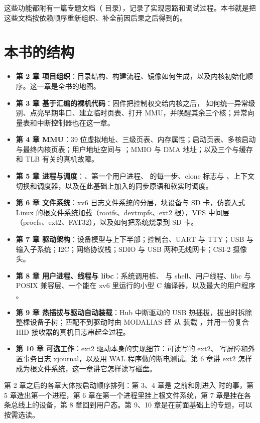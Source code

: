 这些功能都附有一篇专题文档（ 目录），记录了实现思路和调试过程。本书就是把这些文档按依赖顺序重新组织、补全前因后果之后得到的。

\section{本书的结构}

\begin{itemize}
  \item \textbf{第 2 章 项目组织}：目录结构、构建流程、镜像如何生成，以及内核初始化顺序。这一章是全书的地图。
  \item \textbf{第 3 章 基于汇编的裸机代码}：固件把控制权交给内核之后， 如何统一异常级别、点亮早期串口、建立临时页表、打开 MMU，并唤醒其余三个核；异常向量表和中断控制器也在这一章。
  \item \textbf{第 4 章 MMU}：39 位虚拟地址、三级页表、内存属性；启动页表、多核启动与最终内核页表；用户地址空间与 ；MMIO 与 DMA 地址；以及三个与缓存和 TLB 有关的真机故障。
  \item \textbf{第 5 章 进程与调度}：、第一个用户进程、 的每一步、clone 标志与 、上下文切换和调度器，以及在此基础上加入的同步原语和软实时调度。
  \item \textbf{第 6 章 文件系统}：xv6 日志文件系统的分层，块设备与 SD 卡，仿嵌入式 Linux 的根文件系统加载（rootfs、devtmpfs、ext2 根），VFS 中间层（procfs、ext2、FAT32），以及如何把系统烧录到 SD 卡。
  \item \textbf{第 7 章 驱动架构}：设备模型与上下半部；控制台、UART 与 TTY；USB 与输入子系统；I2C；网络协议栈；SDIO 与 USB 两种无线网卡；CSI-2 摄像头。
  \item \textbf{第 8 章 用户进程、线程与 libc}：系统调用桩、 与 shell、用户线程、libc 与 POSIX 兼容层、一个能在 xv6 里运行的小型 C 编译器，以及最大的用户程序 。
  \item \textbf{第 9 章 热插拔与驱动自动装载}：Hub 中断驱动的 USB 热插拔，拔出时拆除整棵设备子树；匹配不到驱动时由 MODALIAS 经  从  装载 ，并用一份复合 HID 接收器的真机日志串起全过程。
  \item \textbf{第 10 章 可选工作}：ext2 驱动本身的实现细节：可读写的 ext2、 写屏障和外置事务日志 xjournal，以及用 WAL 程序做的断电测试。第 6 章讲 ext2 怎样成为根文件系统，这一章讲它怎样读写磁盘。
\end{itemize}

第 2 章之后的各章大体按启动顺序排列：第 3、4 章是  之前和刚进入  时的事，第 5 章造出第一个进程，第 6 章在第一个进程里挂上根文件系统，第 7 章是挂在各条总线上的设备，第 8 章回到用户态。第 9、10 章是在前面基础上的专题，可以按需选读。


